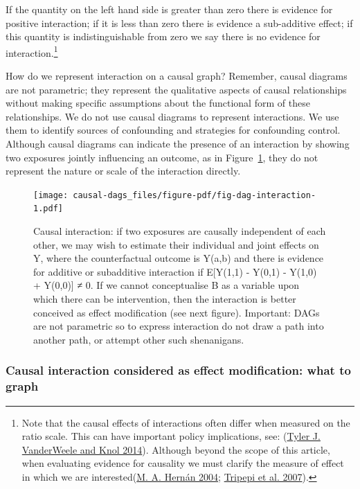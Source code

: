 \documentclass[
  singlecolumn]{report}
\begin{document}
If the quantity on the left hand side is greater than zero there is
evidence for positive interaction; if it is less than zero there is
evidence a sub-additive effect; if this quantity is indistinguishable
from zero we say there is no evidence for interaction.\footnote{Note
  that the causal effects of interactions often differ when measured on
  the ratio scale. This can have important policy implications, see:
  (\protect\hyperlink{ref-vanderweele2014}{Tyler J. VanderWeele and Knol
  2014}). Although beyond the scope of this article, when evaluating
  evidence for causality we must clarify the measure of effect in which
  we are interested(\protect\hyperlink{ref-hernuxe1n2004}{M. A. Hernán
  2004}; \protect\hyperlink{ref-tripepi2007}{Tripepi et al. 2007}).}

How do we represent interaction on a causal graph? Remember, causal
diagrams are not parametric; they represent the qualitative aspects of
causal relationships without making specific assumptions about the
functional form of these relationships. We do not use causal diagrams to
represent interactions. We use them to identify sources of confounding
and strategies for confounding control. Although causal diagrams can
indicate the presence of an interaction by showing two exposures jointly
influencing an outcome, as in Figure~\ref{fig-dag-interaction}, they do
not represent the nature or scale of the interaction directly.

\begin{figure}

{\centering \texttt{[image: causal-dags\_files/figure-pdf/fig-dag-interaction-1.pdf]}

}

\caption{\label{fig-dag-interaction}Causal interaction: if two exposures
are causally independent of each other, we may wish to estimate their
individual and joint effects on Y, where the counterfactual outcome is
Y(a,b) and there is evidence for additive or subadditive interaction if
E{[}Y(1,1) - Y(0,1) - Y(1,0) + Y(0,0){]} ≠ 0. If we cannot conceptualise
B as a variable upon which there can be intervention, then the
interaction is better conceived as effect modification (see next
figure). Important: DAGs are not parametric so to express interaction do
not draw a path into another path, or attempt other such shenanigans.}

\end{figure}

\hypertarget{causal-interaction-considered-as-effect-modification-what-to-graph}{%
\subsubsection{\texorpdfstring{\textbf{Causal interaction considered as
effect modification: what to
graph}}{Causal interaction considered as effect modification: what to graph}}\label{causal-interaction-considered-as-effect-modification-what-to-graph}}
\end{document}
